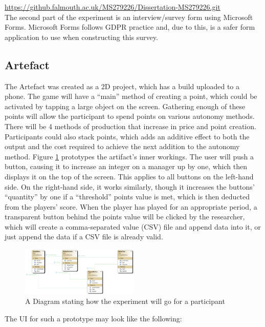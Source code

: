 \documentclass[conference]{IEEEtran}
\begin{document}
\url{https://github.falmouth.ac.uk/MS279226/Dissertation-MS279226.git}\\

The second part of the experiment is an interview/survey form using Microsoft Forms. Microsoft Forms follows GDPR practice and, due to this, is a safer form application to use when constructing this survey.

\subsection{Artefact}
The Artefact was created as a 2D project, which has a build uploaded to a phone. The game will have a “main” method of creating a point, which could be activated by tapping a large object on the screen. Gathering enough of these points will allow the participant to spend points on various autonomy methods. There will be 4 methods of production that increase in price and point creation. Participants could also stack points, which adds an additive effect to both the output and the cost required to achieve the next addition to the autonomy method. Figure \ref{figure3} prototypes the artifact’s inner workings. The user will push a button, causing it to increase an integer on a manager up by one, which then displays it on the top of the screen. This applies to all buttons on the left-hand side. On the right-hand side, it works similarly, though it increases the buttons' “quantity” by one if a “threshold” points value is met, which is then deducted from the players’ score. When the player has played for an appropriate period, a transparent button behind the points value will be clicked by the researcher, which will create a comma-separated value (CSV) file and append data into it, or just append the data if a CSV file is already valid.\\

\begin{figure}[H]
\includegraphics[width = 0.5\textwidth]{UMLProcess}
\caption{A Diagram stating how the experiment will go for a participant}
\label{figure3}
\end{figure}
The UI for such a prototype may look like the following:
\end{document}
